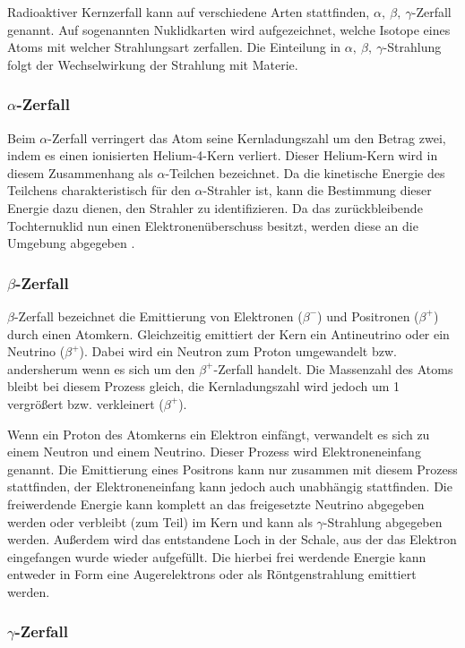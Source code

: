 \documentclass[
	parskip=half,10pt,
	numbers= noenddot, %
	toc=flat, %
	oneside,
	twocolumn,
	]{scrartcl}
\begin{document}
Radioaktiver Kernzerfall kann auf verschiedene Arten stattfinden, $\alpha, ~\beta, ~ \gamma$-Zerfall genannt. Auf sogenannten Nuklidkarten wird aufgezeichnet, welche 
Isotope eines Atoms mit welcher Strahlungsart zerfallen. Die Einteilung in $\alpha, ~\beta, ~ \gamma$-Strahlung folgt der Wechselwirkung der Strahlung mit Materie.

\subsubsection{$\alpha$-Zerfall}
Beim $\alpha$-Zerfall verringert das Atom seine Kernladungszahl um den Betrag zwei, indem es einen ionisierten Helium-4-Kern verliert. Dieser Helium-Kern wird in diesem 
Zusammenhang als $\alpha$-Teilchen bezeichnet. Da die kinetische Energie des Teilchens charakteristisch für den $\alpha$-Strahler ist, kann die Bestimmung dieser 
Energie dazu dienen, den Strahler zu identifizieren. Da das zurückbleibende Tochternuklid nun einen Elektronenüberschuss besitzt, werden diese an die Umgebung abgegeben 
\cite{kuckuk}. 


\subsubsection{$\beta$-Zerfall}
$\beta$-Zerfall bezeichnet die Emittierung von Elektronen ($\beta^-$) und Positronen ($\beta^+$) durch einen Atomkern. Gleichzeitig emittiert der Kern ein 
Antineutrino oder ein Neutrino ($\beta^+$). Dabei wird ein Neutron zum Proton umgewandelt bzw. andersherum wenn es sich um den $\beta^+$-Zerfall handelt. Die 
Massenzahl des Atoms bleibt bei diesem Prozess gleich, die Kernladungszahl wird jedoch um 1 vergrößert bzw. verkleinert ($\beta^+$). 

Wenn ein Proton des Atomkerns ein Elektron einfängt, verwandelt es sich zu einem Neutron und einem Neutrino. Dieser Prozess wird Elektroneneinfang genannt.
Die Emittierung eines Positrons kann nur zusammen mit diesem Prozess stattfinden, der Elektroneneinfang kann jedoch auch unabhängig stattfinden. Die 
freiwerdende Energie kann komplett an das freigesetzte Neutrino abgegeben werden oder verbleibt (zum Teil) im Kern und kann als $\gamma$-Strahlung abgegeben werden. 
Außerdem wird das entstandene Loch in der Schale, aus der das Elektron eingefangen wurde wieder aufgefüllt. Die hierbei frei werdende Energie kann entweder 
in Form eine Augerelektrons oder als Röntgenstrahlung emittiert werden. 

\subsubsection{$\gamma$-Zerfall}
\end{document}
